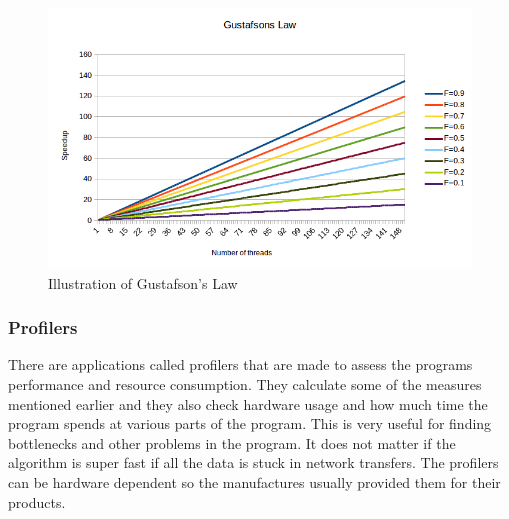 \documentclass[10pt,a4paper]{report}
\begin{document}
\begin{figure}[h]
    \centering
    \includegraphics[width=13cm]{GustafsonsLaw.png}
    \caption{Illustration of Gustafson's Law}
    \label{fig:GustafsonsLaw}
\end{figure}

\subsubsection{Profilers}
There are applications called profilers that are made to assess the programs performance and resource consumption. They calculate some of the measures mentioned earlier and they also check hardware usage and how much time the program spends at various parts of the program. This is very useful for finding bottlenecks and other problems in the program. It does not matter if the algorithm is super fast if all the data is stuck in network transfers. The profilers can be hardware dependent so the manufactures usually provided them for their products.\cite{introduction_hpc_hager, cuda_best_practice}

\clearpage
\end{document}
